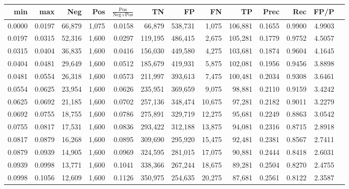 \begin{tabular}{rrrrrrrrrrrrr}
\toprule
   min &    max &    Neg &   Pos & $\frac{\text{Pos}}{\text{Neg}+\text{Pos}}$ &      TN &      FP &      FN &      TP &   Prec &    Rec &   FP/P \\
\midrule
0.0000 & 0.0197 & 66,879 & 1,075 &                                     0.0158 &  66,879 & 538,731 &   1,075 & 106,881 & 0.1655 & 0.9900 & 4.9903 \\
0.0197 & 0.0315 & 52,316 & 1,600 &                                     0.0297 & 119,195 & 486,415 &   2,675 & 105,281 & 0.1779 & 0.9752 & 4.5057 \\
0.0315 & 0.0404 & 36,835 & 1,600 &                                     0.0416 & 156,030 & 449,580 &   4,275 & 103,681 & 0.1874 & 0.9604 & 4.1645 \\
0.0404 & 0.0481 & 29,649 & 1,600 &                                     0.0512 & 185,679 & 419,931 &   5,875 & 102,081 & 0.1956 & 0.9456 & 3.8898 \\
0.0481 & 0.0554 & 26,318 & 1,600 &                                     0.0573 & 211,997 & 393,613 &   7,475 & 100,481 & 0.2034 & 0.9308 & 3.6461 \\
0.0554 & 0.0625 & 23,954 & 1,600 &                                     0.0626 & 235,951 & 369,659 &   9,075 &  98,881 & 0.2110 & 0.9159 & 3.4242 \\
0.0625 & 0.0692 & 21,185 & 1,600 &                                     0.0702 & 257,136 & 348,474 &  10,675 &  97,281 & 0.2182 & 0.9011 & 3.2279 \\
0.0692 & 0.0755 & 18,755 & 1,600 &                                     0.0786 & 275,891 & 329,719 &  12,275 &  95,681 & 0.2249 & 0.8863 & 3.0542 \\
0.0755 & 0.0817 & 17,531 & 1,600 &                                     0.0836 & 293,422 & 312,188 &  13,875 &  94,081 & 0.2316 & 0.8715 & 2.8918 \\
0.0817 & 0.0879 & 16,268 & 1,600 &                                     0.0895 & 309,690 & 295,920 &  15,475 &  92,481 & 0.2381 & 0.8567 & 2.7411 \\
0.0879 & 0.0939 & 14,905 & 1,600 &                                     0.0969 & 324,595 & 281,015 &  17,075 &  90,881 & 0.2444 & 0.8418 & 2.6031 \\
0.0939 & 0.0998 & 13,771 & 1,600 &                                     0.1041 & 338,366 & 267,244 &  18,675 &  89,281 & 0.2504 & 0.8270 & 2.4755 \\
0.0998 & 0.1056 & 12,609 & 1,600 &                                     0.1126 & 350,975 & 254,635 &  20,275 &  87,681 & 0.2561 & 0.8122 & 2.3587 \\

\end{tabular}
